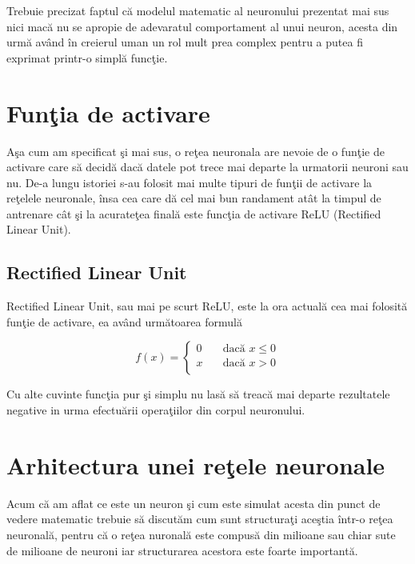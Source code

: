 \par

Trebuie precizat faptul c\u{a} modelul matematic al neuronului prezentat mai sus nici mac\u{a} nu se apropie de adevaratul comportament al unui neuron, acesta din urm\u{a} av\^{a}nd \^{i}n creierul uman un rol mult prea complex pentru a putea fi exprimat printr-o simpl\u{a} func\c{t}ie. 


\section{Fun\c{t}ia de activare}

A\c{s}a cum am specificat \c{s}i mai sus, o re\c{t}ea neuronala are nevoie de o fun\c{t}ie de activare care s\u{a} decid\u{a} dac\u{a} datele pot trece mai departe la urmatorii neuroni sau nu. De-a lungu istoriei s-au folosit mai multe tipuri de fun\c{t}ii de activare la re\c{t}elele neuronale, \^{i}nsa cea care d\u{a} cel mai bun randament at\^{a}t la timpul de antrenare c\^{a}t \c{s}i la acurate\c{t}ea final\u{a} este func\c{t}ia de activare ReLU (Rectified Linear Unit).

\subsection{Rectified Linear Unit}

Rectified Linear Unit, sau mai pe scurt ReLU, este la ora actual\u{a} cea mai folosit\u{a} fun\c{t}ie de activare, ea av\^{a}nd urm\u{a}toarea formul\u{a}

\[ f(x) =
  \begin{cases}
    0       & \quad \text{dac\u{a} } x \leq 0\\
    x  & \quad \text{dac\u{a} } x > 0\\
  \end{cases}
\]

Cu alte cuvinte func\c{t}ia pur \c{s}i simplu nu las\u{a} s\u{a} treac\u{a} mai departe rezultatele negative in urma efectu\u{a}rii opera\c{t}iilor din corpul neuronului.

\section{Arhitectura unei re\c{t}ele neuronale}

Acum c\u{a} am aflat ce este un neuron \c{s}i cum este simulat acesta din punct de vedere matematic trebuie s\u{a} discut\u{a}m cum sunt structura\c{t}i ace\c{s}tia \^{i}ntr-o re\c{t}ea neuronal\u{a}, pentru c\u{a} o re\c{t}ea nuronal\u{a} este compus\u{a} din milioane sau chiar sute de milioane de neuroni iar structurarea acestora este foarte important\u{a}.

